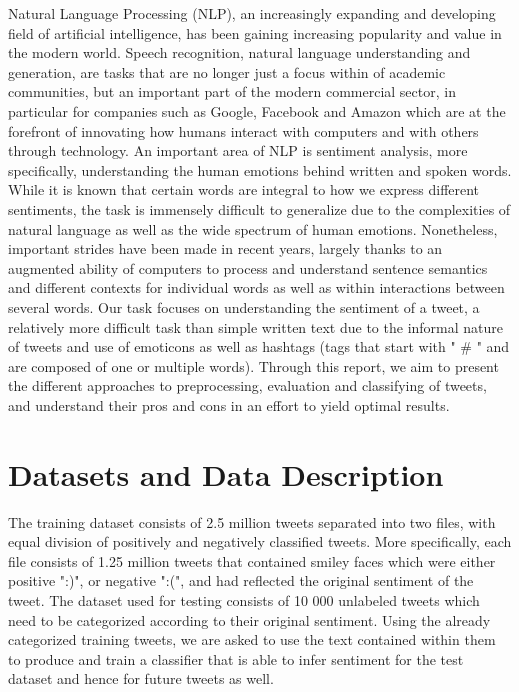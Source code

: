 \documentclass[10pt,conference]{IEEEtran}
\begin{document}
Natural Language Processing (NLP), an increasingly expanding and developing field of artificial intelligence, has been gaining increasing popularity and value in the modern world. Speech recognition, natural language understanding and generation, are tasks that are no longer just a focus within of academic communities, but an important part of the modern commercial sector, in particular for companies such as Google, Facebook and Amazon which are at the forefront of innovating how humans interact with computers and with others through technology.
An important area of NLP is sentiment analysis, more specifically, understanding the human emotions behind written and spoken words. While it is known that certain words are integral to how we express different sentiments, the task is immensely difficult to generalize due to the complexities of natural language as well as the wide spectrum of human emotions. Nonetheless, important strides have been made in recent years, largely thanks to an augmented ability of computers to process and understand sentence semantics and different contexts for individual words as well as within interactions between several words.
Our task focuses on understanding the sentiment of a tweet, a relatively more difficult task than simple written text due to the informal nature of tweets and use of emoticons as well as hashtags (tags that start with " \# " and are composed of one or multiple words). Through this report, we aim to present the different approaches to preprocessing, evaluation and classifying of tweets, and understand their pros and cons in an effort to yield optimal results.


\section{Datasets and Data Description}
\label{sec:data-structure}

The training dataset consists of 2.5 million tweets separated into two files, with equal division of positively and negatively classified tweets. More specifically, each file consists of 1.25 million tweets that contained smiley faces which were either positive ":)", or negative ":(", and had reflected the original sentiment of the tweet. The dataset used for testing consists of 10 000 unlabeled tweets which need to be categorized according to their original sentiment. Using the already categorized training tweets, we are asked to use the text contained within them to produce and train a classifier that is able to infer sentiment for the test dataset and hence for future tweets as well.
 
\end{document}
